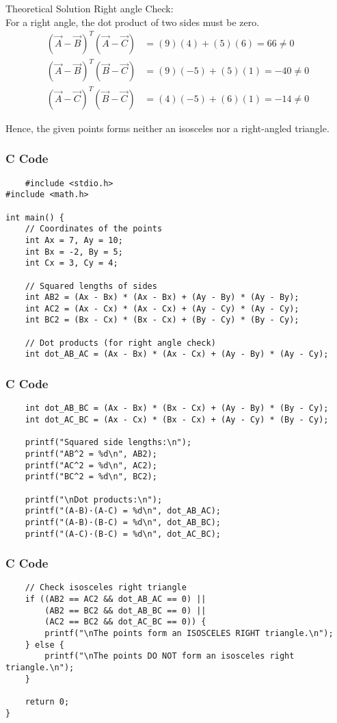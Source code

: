 \documentclass{beamer}
\begin{document}
\begin{frame}{Theoretical Solution}
Right angle Check:\\

For a right angle, the dot product of two sides must be zero.
\begin{align}
(\vec{A}-\vec{B})^T(\vec{A}-\vec{C}) &= (9)(4) + (5)(6) = 66 \neq 0 \\
(\vec{A}-\vec{B})^T(\vec{B}-\vec{C}) &= (9)(-5) + (5)(1) = -40 \neq 0 \\
(\vec{A}-\vec{C})^T(\vec{B}-\vec{C}) &= (4)(-5) + (6)(1) = -14 \neq 0
\end{align}

Hence, the given points forms neither an isosceles nor a right-angled triangle.
\end{frame}

\begin{frame}[fragile]
		\frametitle{C Code}
		\begin{lstlisting}
    #include <stdio.h>
#include <math.h>

int main() {
    // Coordinates of the points
    int Ax = 7, Ay = 10;
    int Bx = -2, By = 5;
    int Cx = 3, Cy = 4;

    // Squared lengths of sides
    int AB2 = (Ax - Bx) * (Ax - Bx) + (Ay - By) * (Ay - By);
    int AC2 = (Ax - Cx) * (Ax - Cx) + (Ay - Cy) * (Ay - Cy);
    int BC2 = (Bx - Cx) * (Bx - Cx) + (By - Cy) * (By - Cy);

    // Dot products (for right angle check)
    int dot_AB_AC = (Ax - Bx) * (Ax - Cx) + (Ay - By) * (Ay - Cy);
    \end{lstlisting}
    \end{frame}
    \begin{frame}[fragile]
		\frametitle{C Code}
		\begin{lstlisting}
    int dot_AB_BC = (Ax - Bx) * (Bx - Cx) + (Ay - By) * (By - Cy);
    int dot_AC_BC = (Ax - Cx) * (Bx - Cx) + (Ay - Cy) * (By - Cy);

    printf("Squared side lengths:\n");
    printf("AB^2 = %d\n", AB2);
    printf("AC^2 = %d\n", AC2);
    printf("BC^2 = %d\n", BC2);

    printf("\nDot products:\n");
    printf("(A-B)·(A-C) = %d\n", dot_AB_AC);
    printf("(A-B)·(B-C) = %d\n", dot_AB_BC);
    printf("(A-C)·(B-C) = %d\n", dot_AC_BC);
 \end{lstlisting}
    \end{frame}
    \begin{frame}[fragile]
		\frametitle{C Code}
		\begin{lstlisting}
    // Check isosceles right triangle
    if ((AB2 == AC2 && dot_AB_AC == 0) ||
        (AB2 == BC2 && dot_AB_BC == 0) ||
        (AC2 == BC2 && dot_AC_BC == 0)) {
        printf("\nThe points form an ISOSCELES RIGHT triangle.\n");
    } else {
        printf("\nThe points DO NOT form an isosceles right triangle.\n");
    }

    return 0;
}
\end{lstlisting}
\end{frame}
\end{document}
